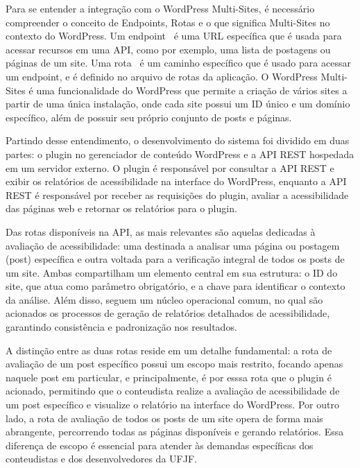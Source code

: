 \documentclass[
    12pt,
    a4paper,
    oneside,
    brazil,
    english
]{article}
\begin{document}
Para se entender a integração com o WordPress Multi-Sites, é necessário compreender
o conceito de Endpoints, Rotas e o que significa Multi-Sites no contexto do WordPress.
Um endpoint~\cite{endpoints} é uma URL específica que é usada para acessar
recursos em uma API, como por exemplo, uma lista de postagens ou páginas de um site. Uma
rota~\cite{routes} é um caminho específico que é usado para acessar um endpoint,
e é definido no arquivo de rotas da aplicação. O WordPress Multi-Sites é uma funcionalidade
do WordPress que permite a criação de vários sites a partir de uma única instalação,
onde cada site possui um ID único e um domínio específico, além de possuir seu próprio
conjunto de posts e páginas.

Partindo desse entendimento, o desenvolvimento do sistema foi dividido em duas partes:
o plugin no gerenciador de conteúdo WordPress e a
API REST hospedada em um servidor externo. O plugin é responsável por
consultar a API REST e exibir os relatórios de acessibilidade na interface do
WordPress, enquanto a API REST é responsável por receber as requisições
do plugin, avaliar a acessibilidade das páginas web e retornar os relatórios
para o plugin.

Das rotas disponíveis na API, as mais relevantes são aquelas dedicadas
à avaliação de acessibilidade: uma destinada a analisar uma página ou postagem (post)
específica e outra voltada para a verificação integral de todos os posts de um
site. Ambas compartilham um elemento central em sua estrutura: o ID do
site, que atua como parâmetro obrigatório, e a chave para identificar o contexto
da análise. Além disso, seguem um núcleo operacional comum, no qual são
acionados os processos de geração de relatórios detalhados de acessibilidade,
garantindo consistência e padronização nos resultados.

A distinção entre as duas rotas reside em um detalhe fundamental: a rota
de avaliação de um post específico possui um escopo mais restrito, focando
apenas naquele post em particular, e principalmente, é por esssa rota que
o plugin é acionado, permitindo que o conteudista realize a avaliação de
acessibilidade de um post específico e visualize o relatório na interface do
WordPress. Por outro lado, a rota de avaliação de todos os posts de um site
opera de forma mais abrangente, percorrendo todas as páginas disponíveis
e gerando relatórios. Essa diferença de escopo é essencial para atender às
demandas específicas dos conteudistas e dos desenvolvedores da UFJF.
\bigbreak
\end{document}
